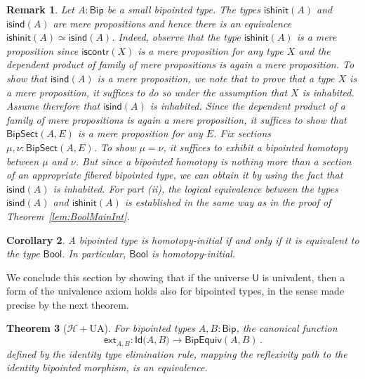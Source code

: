\documentclass[10pt,a4paper,oneside,reqno]{amsart}
\numberwithin{equation}{section}
\theoremstyle{mythm}
\newtheorem{theorem}{Theorem}[section]
\newtheorem{corollary}[theorem]{Corollary}
\theoremstyle{mydef}
\theoremstyle{myrmk}
\newtheorem{remark}[theorem]{Remark}
\newcommand{\co}{\colon}
\newcommand{\Hint}{\mathcal{H}}
\newcommand{\iscontr}{\mathsf{iscontr}}
\newcommand{\ext}{\mathsf{ext}}
\newcommand{\Id}{\mathsf{Id}}
\newcommand{\Bool}{\mathsf{Bool}}
\newcommand{\UU}{\mathsf{U}}
\newcommand{\Bip}{\mathsf{Bip}}
\newcommand{\BipSect}{\mathsf{BipSect}}
\newcommand{\ishinit}{\mathsf{ishinit}}
\newcommand{\isind}{\mathsf{isind}}
\newcommand{\BipEquiv}{\mathsf{BipEquiv}}
\begin{document}
\begin{remark}\label{lem:BoolMainInternal} Let   $A: \Bip$ be a small bipointed type.
 The types $\ishinit(A)$ and $\isind(A)$ are mere
propositions and hence there is an equivalence $\ishinit(A)  \simeq   \isind(A)$.
Indeed, observe that
the type $\ishinit(A)$ is a mere proposition since $\iscontr(X)$ is a mere proposition for any type $X$ and the dependent product of family of mere propositions is again a mere proposition. To show that $\isind (A)$ is a mere proposition, we note that to prove that a type $X$ is a mere proposition, it suffices to do so under the assumption that $X$ is inhabited. Assume therefore that $\isind(A)$ is inhabited. Since the dependent product of a family of mere propositions is again a mere proposition, it suffices to show that $\BipSect(A,E)$ is a mere proposition for any $E$. Fix sections $\mu, \nu : \BipSect(A,E)$. To show $\mu = \nu$, it suffices to exhibit a bipointed homotopy between $\mu$ and $\nu$. But since a bipointed homotopy is nothing more than a section of an appropriate fibered bipointed type, we can obtain it by using the fact that $\isind(A)$ is inhabited.
For part (ii), the logical equivalence between the types $\isind(A)$ and 
$\ishinit(A)$ is established in the same way as in the proof of  Theorem~\ref{lem:BoolMainInt}. 
\end{remark}


\begin{corollary}\label{lem:BoolInitInt}
A bipointed type is homotopy-initial if and only if it is equivalent to the type $\Bool$. In particular, $\Bool$ is homotopy-initial.
\end{corollary}




We conclude this section by showing that if the universe $\UU$ is univalent, then a form of the univalence axiom holds also for bipointed types, in the sense made precise by the next theorem.


\begin{theorem}[$\Hint + \mathrm{UA}$] \label{thm:bipunivalence}
For bipointed types $A, B : \Bip$, the canonical function
\[ 
\ext_{A,B} \co \Id \big(A,B\big) \to  \BipEquiv(A,B) \, .
\] 
defined by the identity type elimination rule, mapping the reflexivity path to the identity bipointed morphism, 
is an equivalence.
\end{theorem} 
\end{document}
